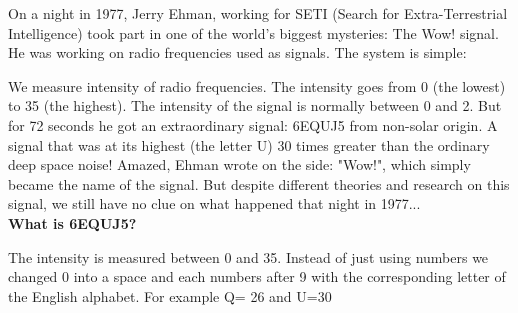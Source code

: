 \begin{tcolorbox}[colback=red!5,colframe=DarkRed!40!black,title=\textbf{The wow! signal: Our first Extra-Terrestrial communication?}]

On a night in 1977, Jerry Ehman, working for SETI (Search for Extra-Terrestrial Intelligence) took part in one of the world's biggest mysteries: The Wow! signal. 
He was working on radio frequencies used as signals. The system is simple:

We measure intensity of radio frequencies. The intensity goes from 0 (the lowest) to 35 (the highest).  The intensity of the signal is normally between 0 and 2. But for 72 seconds he got an extraordinary signal: 6EQUJ5 from non-solar origin. A signal that was at its highest (the letter U) 30 times greater than the ordinary deep space noise! Amazed, Ehman wrote on the side: "Wow!", which simply became the name of the signal. But despite different theories and research on this signal, we still have no clue on what happened that night in 1977... \\

\textbf{What is 6EQUJ5?}

The intensity is measured between 0 and 35. Instead of just using numbers we changed 0 into a space and each numbers after 9 with the corresponding letter of the English alphabet. For example Q= 26 and U=30
\end{tcolorbox}